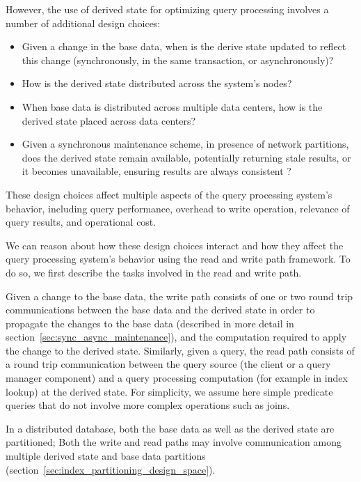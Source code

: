 However, the use of derived state for optimizing query processing involves a number of additional design choices:
\begin{itemize}

  \item Given a change in the base data, when is the derive state updated to reflect this change (synchronously, in the
  same transaction, or asynchronously)?

  \item How is the derived state distributed across the system's nodes?

  \item When base data is distributed across multiple data centers, how is the derived state placed across data centers?

  \item Given a synchronous maintenance scheme, in presence of network partitions,
  does the derived state remain available, potentially returning stale results,
  or it becomes unavailable, ensuring results are always consistent ?

\end{itemize}

These design choices affect multiple aspects of the query processing system's behavior,
including query performance, overhead to write operation, relevance of query results, and operational cost.

We can reason about how these design choices interact and how they affect the query processing system's behavior
using the read and write path framework.
To do so, we first describe the tasks involved in the read and write path.

Given a change to the base data,
the write path consists of one or two round trip communications between the base data and the derived state
in order to propagate the changes to the base data (described in more detail in section~\ref{sec:sync_async_maintenance}),
and the computation required to apply the change to the derived state.
Similarly, given a query, the read path consists of a round trip communication between the query source (the client or a
query manager component) and a query processing computation (for example in index lookup) at the derived state.
For simplicity, we assume here simple predicate queries that do not involve more complex operations such as joins.

In a distributed database, both the base data as well as the derived state are partitioned;
Both the write and read paths may involve communication among multiple derived state and base data
partitions (section~\ref{sec:index_partitioning_design_space}).


